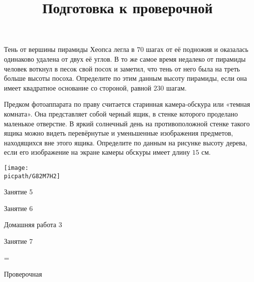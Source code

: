 \begin{homework}[number=2]
	\begin{listofex}
		\item Тень от вершины пирамиды Хеопса легла	в \( 70 \) шагах от её подножия и оказалась	одинаково удалена от двух её углов. В то же самое время недалеко от пирамиды человек воткнул в песок свой посох и	заметил, что тень от него была на треть	больше высоты посоха. Определите по	этим данным высоту пирамиды, если она имеет квадратное основание со стороной, равной \( 230 \) шагам.
		\item Предком фотоаппарата по праву считается старинная камера-обскура или «темная комната». Она представляет собой черный ящик, в стенке которого проделано маленькое отверстие. В яркий солнечный
		день на противоположной стенке такого ящика можно видеть перевёрнутые и	уменьшенные изображения предметов, находящихся вне этого ящика. Определите по данным на рисунке высоту дерева, если его изображение на экране камеры обскуры имеет длину \( 15 \) см.
		\begin{center}
			\texttt{[image: \\picpath/G82M7H2]}
		\end{center}
	\end{listofex}
\end{homework}

\begin{class}[number=5]
	\begin{listofex}
		\item Занятие 5
	\end{listofex}
\end{class}

\begin{class}[number=6]
	\begin{listofex}
		\item Занятие 6
	\end{listofex}
\end{class}

\begin{homework}[number=3]
	\begin{listofex}
		\item Домашняя работа 3
	\end{listofex}
\end{homework}

\begin{class}[number=7]
	\title{Подготовка к проверочной}
	\begin{listofex}
		\item Занятие 7
	\end{listofex}
\end{class}

=%
\begin{exam}
	\begin{listofex}
		\item Проверочная
	\end{listofex}
\end{exam}
